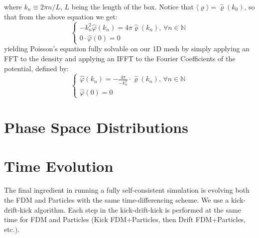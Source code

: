 \documentclass{book}
\begin{document}
where $k_n \equiv 2\pi n / L$, $L$ being the length of the box. Notice that $\langle\varrho\rangle = \hat{\varrho}(k_0)$, so that from the above equation we get:
\begin{equation*}
    \begin{cases}
    -k_n^2 \hat{\varphi}(k_n) = 4 \pi \hat{\varrho}(k_n) \text{, $\forall n \in \mathbb{N}$} \\
    0\cdot \hat{\varphi}(0) = 0
    \end{cases}
\end{equation*}
yielding Poisson's equation fully solvable on our 1D mesh by simply applying an FFT to the density and applying an IFFT to the Fourier Coefficients of the potential, defined by:
\begin{equation*}
    \begin{cases}
    \hat{\varphi}(k_n) = - \frac{4 \pi}{-k_n^2} \cdot \hat{\varrho}(k_n) \text{, $\forall n \in \mathbb{N}$} \\
    \hat{\varphi}(0) = 0
    \end{cases}
\end{equation*}

\section{Phase Space Distributions}

\section{Time Evolution}

The final ingredient in running a fully self-consistent simulation is evolving both the FDM and Particles with the same time-differencing scheme. We use a kick-drift-kick algorithm. Each step in the kick-drift-kick is performed at the same time for FDM and Particles (Kick FDM+Particles, then Drift FDM+Particles, etc.).
\end{document}
